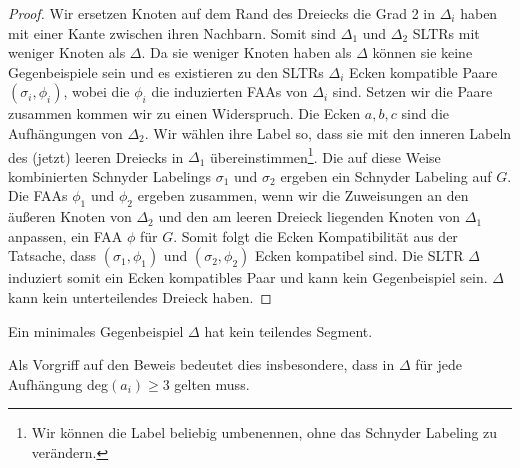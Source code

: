 \begin{proof}
Wir ersetzen Knoten auf dem Rand des Dreiecks die Grad 2 in $\Delta_i$ haben mit einer Kante zwischen ihren Nachbarn. Somit sind $\Delta_1$ und $\Delta_2$ SLTRs mit weniger Knoten als $\Delta$. Da sie weniger Knoten haben als $\Delta$ können sie keine Gegenbeispiele sein und es existieren zu den SLTRs $\Delta_i$ Ecken kompatible Paare $(\sigma_i,\phi_i)$, wobei die $\phi_i$ die induzierten FAAs von $\Delta_i$ sind. Setzen wir die Paare zusammen kommen wir zu einen Widerspruch. Die Ecken $a,b,c$ sind die Aufhängungen von $\Delta_2$. Wir wählen ihre Label so, dass sie mit den inneren Labeln des (jetzt) leeren Dreiecks in $\Delta_1$ übereinstimmen\footnote{Wir können die Label beliebig umbenennen, ohne das Schnyder Labeling zu verändern.}. Die auf diese Weise kombinierten Schnyder Labelings $\sigma_1$ und $\sigma_2$ ergeben ein Schnyder Labeling auf $G$. Die FAAs $\phi_1$ und $\phi_2$ ergeben zusammen, wenn wir die Zuweisungen an den äußeren Knoten von $\Delta_2$ und den am leeren Dreieck liegenden Knoten von $\Delta_1$ anpassen, ein FAA $\phi$ für $G$. Somit folgt die Ecken Kompatibilität aus der Tatsache, dass $(\sigma_1,\phi_1)$ und $(\sigma_2,\phi_2)$ Ecken kompatibel sind. Die SLTR $\Delta$ induziert somit ein Ecken kompatibles Paar und kann kein Gegenbeispiel sein. $\Delta$ kann kein unterteilendes Dreieck haben.
\end{proof} 

\begin{lemma}\label{lem3}
Ein minimales Gegenbeispiel $\Delta$ hat kein teilendes Segment.
\end{lemma}

\begin{remark}
Als Vorgriff auf den Beweis bedeutet dies insbesondere, dass in $\Delta$ für jede Aufhängung deg$(a_i) \geq 3$ gelten muss.
\end{remark}

